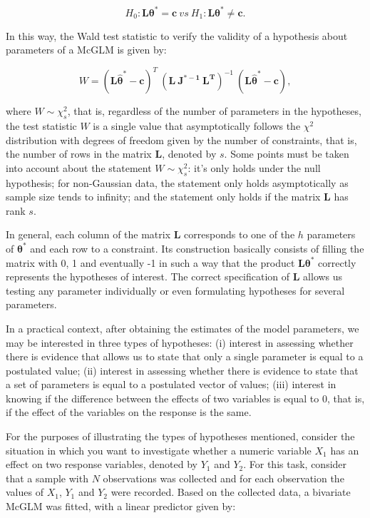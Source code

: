 \documentclass[Review,sagev,times, doublespace]{sagej}
\begin{document}
\begin{equation}
\label{eq:hipoteses_wald}
H_0: \boldsymbol{L}\boldsymbol{\theta^{*}} = \boldsymbol{c} \ vs \ H_1: \boldsymbol{L}\boldsymbol{\theta^{*}} \neq \boldsymbol{c}. 
\end{equation}

\noindent In this way, the Wald test statistic to verify the validity of a hypothesis about parameters of a McGLM is given by:

$$
W = (\boldsymbol{L\hat\theta^{*}} - \boldsymbol{c})^T \ (\boldsymbol{L \ J^{\boldsymbol{*}-1} \ L^T})^{-1} \ (\boldsymbol{L\hat\theta^{*}} - \boldsymbol{c}),
$$

\noindent where $W \sim \chi^2_s$, that is, regardless of the number of parameters in the hypotheses, the test statistic $W$ is a single value that asymptotically follows the $\chi^2$ distribution with degrees of freedom given by the number of constraints, that is, the number of rows in the matrix $\boldsymbol{L}$, denoted by $s$. Some points must be taken into account about the statement $W \sim \chi^2_s$: it's only holds under the null hypothesis; for non-Gaussian data, the statement only holds asymptotically as sample size tends to infinity; and the statement only holds if the matrix $\boldsymbol{L}$ has rank $s$.

In general, each column of the matrix $\boldsymbol{L}$ corresponds to one of the $h$ parameters of $\boldsymbol{\theta^{*}}$ and each row to a constraint. Its construction basically consists of filling the matrix with 0, 1 and eventually -1 in such a way that the product $\boldsymbol{L}\boldsymbol{\theta^{*}}$ correctly represents the hypotheses of interest. The correct specification of $\boldsymbol{L}$ allows us testing any parameter individually or even formulating hypotheses for several parameters.

In a practical context, after obtaining the estimates of the model parameters, we may be interested in three types of hypotheses: (i) interest in assessing whether there is evidence that allows us to state that only a single parameter is equal to a postulated value; (ii) interest in assessing whether there is evidence to state that a set of parameters is equal to a postulated vector of values; (iii) interest in knowing if the difference between the effects of two variables is equal to 0, that is, if the effect of the variables on the response is the same.

For the purposes of illustrating the types of hypotheses mentioned, consider the situation in which you want to investigate whether a numeric variable $X_1$ has an effect on two response variables, denoted by $Y_1$ and $Y_2$. For this task, consider that a sample with $N$ observations was collected and for each observation the values of $X_1$, $Y_1$ and $Y_2$ were recorded. Based on the collected data, a bivariate McGLM was fitted, with a linear predictor given by:
\end{document}
